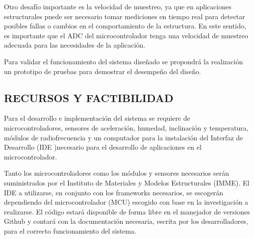 \documentclass[12pt,letterpaper]{article}
\newcommand{\newfig}[4]{%
\begin{figure}[H]%
\centering%
\texttt{[image: \#2]}%
\caption{\emph{\small{#3}}}%
\label{fig:#4}
\end{figure}%
}
\begin{document}
Otro desafío importante es la velocidad de muestreo, ya que en aplicaciones estructurales puede ser necesario tomar mediciones en tiempo real para detectar posibles fallas o cambios en el comportamiento de la estructura. En este sentido, es importante que el ADC del microcontrolador tenga una velocidad de muestreo adecuada para las necesidades de la aplicación.

Para validar el funcionamiento del sistema diseñado se propondrá la realización un prototipo de pruebas para demostrar el desempeño del diseño.





\newpage

\begin{center}
	\section*{ RECURSOS Y FACTIBILIDAD}
\end{center}

Para el desarrollo e implementación del sistema se requiere de microcontroladores, sensores de aceleración, humedad, inclinación y temperatura, módulos de radiofrecuencia y un computador para la instalación del Interfaz de Desarrollo (IDE )necesario para el desarrollo de aplicaciones en el microcontrolador.

Tanto los microcontroladores como los módulos y sensores necesarios serán suministrados por el Instituto de Materiales y Modelos Estructurales (IMME). El IDE a utilizarse, en conjunto con los frameworks necesarios, se escogerán dependiendo del microcontrolador (MCU) escogido con base en la investigación a realizarse. El código estará disponible de forma libre en el manejador de versiones Github y contará con la documentación necesaria, escrita por los desarrolladores, para el correcto funcionamiento del sistema.

\newpage
\end{document}
